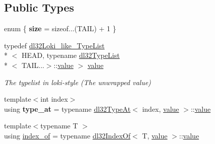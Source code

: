 \subsection*{Public Types}
\begin{DoxyCompactItemize}
\item 
enum \{ {\bfseries size} = sizeof...(T\-A\-I\-L) + 1
 \}
\item 
\hypertarget{structdl32_type_list_3_01_h_e_a_d_00_01_t_a_i_l_8_8_8_4_af4eaf1a048d9b7b41453af3d5ba7f889}{typedef \hyperlink{classdl32_loki__like___type_list}{dl32\-Loki\-\_\-like\-\_\-\-Type\-List}\\*
$<$ H\-E\-A\-D, typename \hyperlink{structdl32_type_list}{dl32\-Type\-List}\\*
$<$ T\-A\-I\-L...$>$\-::\hyperlink{structdl32_type_list_3_01_h_e_a_d_00_01_t_a_i_l_8_8_8_4_af4eaf1a048d9b7b41453af3d5ba7f889}{value} $>$ \hyperlink{structdl32_type_list_3_01_h_e_a_d_00_01_t_a_i_l_8_8_8_4_af4eaf1a048d9b7b41453af3d5ba7f889}{value}}\label{structdl32_type_list_3_01_h_e_a_d_00_01_t_a_i_l_8_8_8_4_af4eaf1a048d9b7b41453af3d5ba7f889}

\begin{DoxyCompactList}\small\item\em The typelist in loki-\/style (The unwrapped value) \end{DoxyCompactList}\item 
\hypertarget{structdl32_type_list_3_01_h_e_a_d_00_01_t_a_i_l_8_8_8_4_af6de037b1d27ec5b8af7483bc580b4f4}{{\footnotesize template$<$int index$>$ }\\using {\bfseries type\-\_\-at} = typename \hyperlink{classdl32_type_at}{dl32\-Type\-At}$<$ index, \hyperlink{structdl32_type_list_3_01_h_e_a_d_00_01_t_a_i_l_8_8_8_4_af4eaf1a048d9b7b41453af3d5ba7f889}{value} $>$\-::\hyperlink{structdl32_type_list_3_01_h_e_a_d_00_01_t_a_i_l_8_8_8_4_af4eaf1a048d9b7b41453af3d5ba7f889}{value}}\label{structdl32_type_list_3_01_h_e_a_d_00_01_t_a_i_l_8_8_8_4_af6de037b1d27ec5b8af7483bc580b4f4}

\item 
\hypertarget{structdl32_type_list_3_01_h_e_a_d_00_01_t_a_i_l_8_8_8_4_a9d5a10bc245a9ca2785bda5762624b23}{{\footnotesize template$<$typename T $>$ }\\using \hyperlink{structdl32_type_list_3_01_h_e_a_d_00_01_t_a_i_l_8_8_8_4_a9d5a10bc245a9ca2785bda5762624b23}{index\-\_\-of} = typename \hyperlink{structdl32_index_of}{dl32\-Index\-Of}$<$ T, \hyperlink{structdl32_type_list_3_01_h_e_a_d_00_01_t_a_i_l_8_8_8_4_af4eaf1a048d9b7b41453af3d5ba7f889}{value} $>$\-::\hyperlink{structdl32_type_list_3_01_h_e_a_d_00_01_t_a_i_l_8_8_8_4_af4eaf1a048d9b7b41453af3d5ba7f889}{value}}\label{structdl32_type_list_3_01_h_e_a_d_00_01_t_a_i_l_8_8_8_4_a9d5a10bc245a9ca2785bda5762624b23}


\end{DoxyCompactItemize}
